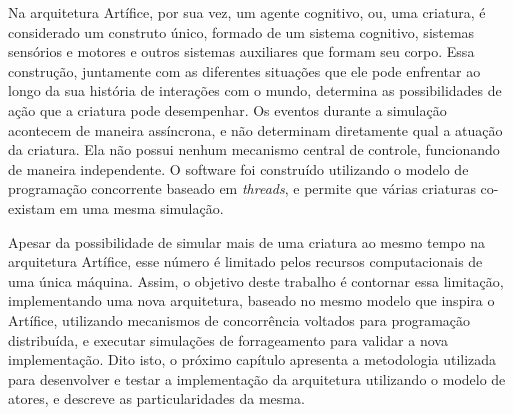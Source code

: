 Na arquitetura Artífice, por sua vez, um agente cognitivo, ou, uma criatura, é considerado um construto único, formado de um sistema cognitivo, sistemas sensórios e motores e outros sistemas auxiliares que formam seu corpo. Essa construção, juntamente com as diferentes situações que ele pode enfrentar ao longo da sua história de interações com o mundo, determina as possibilidades de ação que a criatura pode desempenhar. Os eventos durante a simulação acontecem de maneira assíncrona, e não determinam diretamente qual a atuação da criatura. Ela não possui nenhum mecanismo central de controle, funcionando de maneira independente. O software foi construído utilizando o modelo de programação concorrente baseado em \textit{threads}, e permite que várias criaturas co-existam em uma mesma simulação. 

Apesar da possibilidade de simular mais de uma criatura ao mesmo tempo na arquitetura Artífice, esse número é limitado pelos recursos computacionais de uma única máquina. Assim, o objetivo deste trabalho é contornar essa limitação, implementando uma nova arquitetura, baseado no mesmo modelo que inspira o Artífice, utilizando mecanismos de concorrência voltados para programação distribuída, e executar simulações de forrageamento para validar a nova implementação. Dito isto, o próximo capítulo apresenta a metodologia utilizada para desenvolver e testar a implementação da arquitetura utilizando o modelo de atores, e descreve as particularidades da mesma.